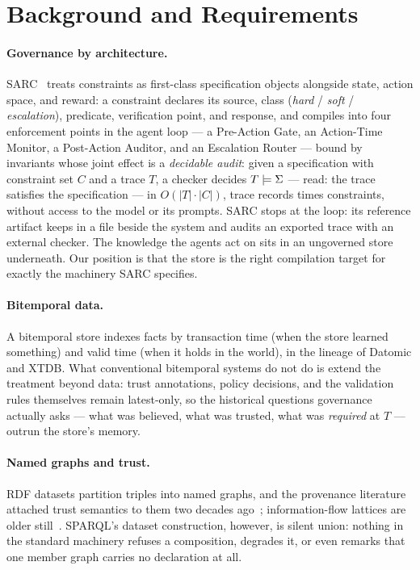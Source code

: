 \section{Background and Requirements}
\label{sec:background}

\paragraph{Governance by architecture.}
SARC~\cite{besanson2026sarc} treats constraints as first-class
specification objects alongside state, action space, and reward: a
constraint declares its source, class (\emph{hard} / \emph{soft} /
\emph{escalation}), predicate, verification point, and response, and
compiles into four enforcement points in the agent loop --- a Pre-Action
Gate, an Action-Time Monitor, a Post-Action Auditor, and an Escalation
Router --- bound by invariants whose joint effect is a \emph{decidable
audit}: given a specification \Sig with constraint set $C$ and a
trace $T$, a checker decides $T \models \Sigma$ --- read: the trace
satisfies the specification --- in $O(|T|\cdot|C|)$, trace records
times constraints, without access to the model or its prompts. SARC stops at the loop: its reference artifact keeps \Sig
in a file beside the system and audits an exported trace with an
external checker. The knowledge the agents act on sits in an
ungoverned store underneath. Our position is that the store is the
right compilation target for exactly the machinery SARC specifies.

\paragraph{Bitemporal data.}
A bitemporal store indexes facts by transaction time (when the store
learned something) and valid time (when it holds in the world), in the
lineage of Datomic and XTDB. What conventional bitemporal systems do
not do is extend the treatment beyond data: trust annotations, policy
decisions, and the validation rules themselves remain latest-only, so
the historical questions governance actually asks --- what was believed,
what was trusted, what was \emph{required} at $T$ --- outrun the store's
memory.

\paragraph{Named graphs and trust.}
RDF datasets partition triples into named graphs, and the provenance
literature attached trust semantics to them two decades
ago~\cite{carroll2005named}; information-flow lattices are older
still~\cite{denning1976lattice}. SPARQL's dataset construction,
however, is silent union: nothing in the standard machinery refuses a
composition, degrades it, or even remarks that one member graph carries
no declaration at all.

